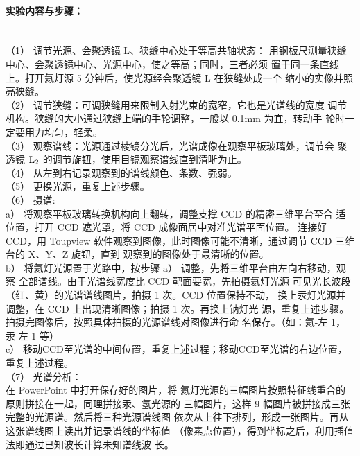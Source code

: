 \documentclass[UTF8]{ctexart}
\begin{document}
\paragraph*{实验内容与步骤：}~\\
\indent（1） 调节光源、会聚透镜 L、狭缝中心处于等高共轴状态：
用钢板尺测量狭缝中心、会聚透镜中心、光源中心，使之等高；同时，三者必须
置于同一条直线上。打开氦灯源 5 分钟后，使光源经会聚透镜 L 在狭缝处成一个
缩小的实像并照亮狭缝。~\\
\indent（2） 调节狭缝：可调狭缝用来限制入射光束的宽窄，它也是光谱线的宽度
调节机构。狭缝的大小通过狭缝上端的手轮调整，一般以 0.1mm 为宜，转动手
轮时一定要用力均匀，轻柔。~\\
\indent（3） 观察谱线：光源通过棱镜分光后，光谱成像在观察平板玻璃处，调节会
聚透镜 $\rm{L_2}$ 的调节旋钮，使用目镜观察谱线直到清晰为止。~\\
\indent（4） 从左到右记录观察到的谱线颜色、条数、强弱。~\\
\indent（5） 更换光源，重复上述步骤。~\\
\indent（6） 摄谱:~\\
\indent a） 将观察平板玻璃转换机构向上翻转，调整支撑 CCD 的精密三维平台至合
适位置，打开 CCD 遮光罩，将 CCD 成像面居中对准光谱平面位置。
连接好 CCD，用 Toupview 软件观察到图像，此时图像可能不清晰，通过调节 CCD 三维台的 X、Y、Z 旋钮，直到
观察到的图像处于最清晰的位置。~\\
\indent b） 将氦灯光源置于光路中，按步骤 a） 调整，先将三维平台由左向右移动，观察
全部谱线。由于光谱线宽度比 CCD 靶面要宽，先拍摄氦灯光源
可见光长波段（红、黄）的光谱谱线图片，拍摄 1 次。CCD 位置保持不动，
换上汞灯光源并调整，在 CCD 上出现清晰图像；拍摄 1 次。再换上钠灯光
源，重复上述步骤。拍摄完图像后，按照具体拍摄的光源谱线对图像进行命
名保存。（如：氦-左 1，汞-左 1 等）~\\
\indent c） 移动CCD至光谱的中间位置，重复上述过程；移动CCD至光谱的右边位置，
重复上述过程。~\\
\indent（7） 光谱分析：~\\
\indent 在 PowerPoint 中打开保存好的图片，将
氦灯光源的三幅图片按照特征线重合的原则拼接在一起，同理拼接汞、氢光源的
三幅图片，这样 9 幅图片被拼接成三张完整的光源谱。然后将三种光源谱线图
依次从上往下排列，形成一张图片。再从这张谱线图上读出并记录谱线的坐标值
（像素点位置），得到坐标之后，利用插值法即通过已知波长计算未知谱线波
长。~\\
\end{document}
